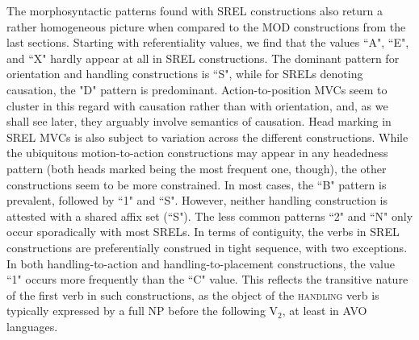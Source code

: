 
The morphosyntactic patterns found with SREL constructions also return a rather homogeneous picture when compared to the MOD constructions from the last sections. Starting with referentiality values, we find that the values ``A", ``E", and ``X" hardly appear at all in SREL constructions. The dominant pattern for orientation and handling constructions is ``S", while for SRELs denoting causation, the "D" pattern is predominant. Action-to-position MVCs seem to cluster in this regard with causation rather than with orientation, and, as we shall see later, they arguably involve semantics of causation. Head marking in SREL MVCs is also subject to variation across the different constructions. While the ubiquitous motion-to-action constructions may appear in any headedness pattern (both heads marked being the most frequent one, though), the other constructions seem to be more constrained. In most cases, the ``B" pattern is prevalent, followed by ``1" and ``S". However, neither handling construction is attested with a shared affix set (``S"). The less common patterns ``2" and ``N" only occur sporadically with most SRELs. In terms of contiguity, the verbs in SREL constructions are preferentially construed in tight sequence, with two exceptions. In both handling-to-action and handling-to-placement constructions, the value ``1" occurs more frequently than the ``C" value. This reflects the transitive nature of the first verb in such constructions, as the object of the \textsc{handling} verb is typically expressed by a full NP before the following V$_2$, at least in AVO languages.

